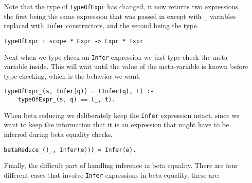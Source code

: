 Note that the type of \verb|typeOfExpr| has changed, it now returns two expressions, the first being the same expression that was passed in except with \verb|_| variables replaced with \verb|Infer| constructors, and the second being the type.
\begin{lstlisting}
typeOfExpr : scope * Expr -> Expr * Expr
\end{lstlisting}

Next when we type-check an \verb|Infer| expression we just type-check the meta-variable inside. This will wait until the value of the meta-variable is known before type-checking, which is the behavior we want.
\begin{lstlisting}
typeOfExpr_(s, Infer(q)) = (Infer(q), t) :-
	typeOfExpr_(s, q) == (_, t).
\end{lstlisting}

When beta reducing we deliberately keep the \verb|Infer| expression intact, since we want to keep the information that it is an expression that might have to be inferred during beta equality checks.
\begin{lstlisting}
betaReduce_((_, Infer(e))) = Infer(e).
\end{lstlisting}

Finally, the difficult part of handling inference in beta equality. There are four different cases that involve \verb|Infer| expressions in beta equality, these are:

